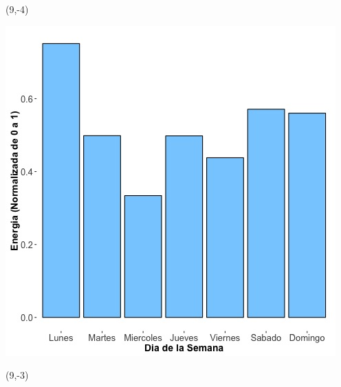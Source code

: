 \documentclass{article}\usepackage[]{graphicx}\usepackage[]{color}
\newenvironment{knitrout}{}{} %
\begin{document}
 \begin{textblock}{1}(9,-4)
\begin{minipage}{20em}
\begingroup

\endgroup
\end{minipage}
\end{textblock}


\begin{knitrout}
\color{fgcolor}
\includegraphics[scale=0.65]{figure/A18_day_of_week_plot} 
\end{knitrout}


 \begin{textblock}{1}(9,-3)
\begin{minipage}{20em}
\begingroup

\endgroup
\end{minipage}
\end{textblock}

 \vspace{2cm}
\end{document}
